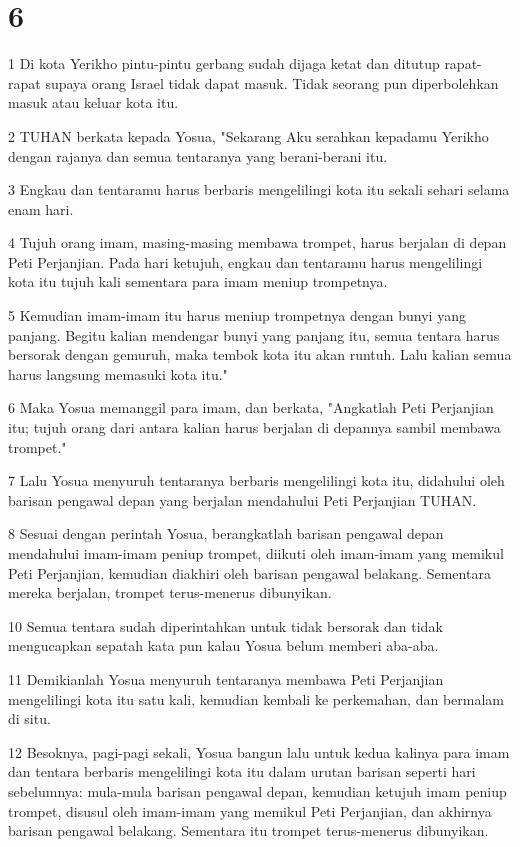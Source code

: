 \chapter{6}

\par 1 Di kota Yerikho pintu-pintu gerbang sudah dijaga ketat dan ditutup rapat-rapat supaya orang Israel tidak dapat masuk. Tidak seorang pun diperbolehkan masuk atau keluar kota itu.
\par 2 TUHAN berkata kepada Yosua, "Sekarang Aku serahkan kepadamu Yerikho dengan rajanya dan semua tentaranya yang berani-berani itu.
\par 3 Engkau dan tentaramu harus berbaris mengelilingi kota itu sekali sehari selama enam hari.
\par 4 Tujuh orang imam, masing-masing membawa trompet, harus berjalan di depan Peti Perjanjian. Pada hari ketujuh, engkau dan tentaramu harus mengelilingi kota itu tujuh kali sementara para imam meniup trompetnya.
\par 5 Kemudian imam-imam itu harus meniup trompetnya dengan bunyi yang panjang. Begitu kalian mendengar bunyi yang panjang itu, semua tentara harus bersorak dengan gemuruh, maka tembok kota itu akan runtuh. Lalu kalian semua harus langsung memasuki kota itu."
\par 6 Maka Yosua memanggil para imam, dan berkata, "Angkatlah Peti Perjanjian itu; tujuh orang dari antara kalian harus berjalan di depannya sambil membawa trompet."
\par 7 Lalu Yosua menyuruh tentaranya berbaris mengelilingi kota itu, didahului oleh barisan pengawal depan yang berjalan mendahului Peti Perjanjian TUHAN.
\par 8 Sesuai dengan perintah Yosua, berangkatlah barisan pengawal depan mendahului imam-imam peniup trompet, diikuti oleh imam-imam yang memikul Peti Perjanjian, kemudian diakhiri oleh barisan pengawal belakang. Sementara mereka berjalan, trompet terus-menerus dibunyikan.
\par 10 Semua tentara sudah diperintahkan untuk tidak bersorak dan tidak mengucapkan sepatah kata pun kalau Yosua belum memberi aba-aba.
\par 11 Demikianlah Yosua menyuruh tentaranya membawa Peti Perjanjian mengelilingi kota itu satu kali, kemudian kembali ke perkemahan, dan bermalam di situ.
\par 12 Besoknya, pagi-pagi sekali, Yosua bangun lalu untuk kedua kalinya para imam dan tentara berbaris mengelilingi kota itu dalam urutan barisan seperti hari sebelumnya: mula-mula barisan pengawal depan, kemudian ketujuh imam peniup trompet, disusul oleh imam-imam yang memikul Peti Perjanjian, dan akhirnya barisan pengawal belakang. Sementara itu trompet terus-menerus dibunyikan.
